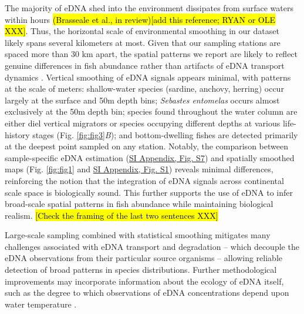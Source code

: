 \documentclass[9pt,twocolumn,twoside]{pnas-new}
\begin{document}
The majority of eDNA shed into the environment dissipates from surface waters within hours \hl{(Brasseale et al., in review)[add this reference; RYAN or OLE XXX]}. Thus, the horizontal scale of environmental smoothing in our dataset likely spans several kilometers at most. Given that our sampling stations are spaced more than 30 km apart, the spatial patterns we report are likely to reflect genuine differences in fish abundance rather than artifacts of eDNA transport dynamics \cite{guri2023}. Vertical smoothing of eDNA signals appears minimal, with patterns at the scale of meters: shallow-water species (sardine, anchovy, herring) occur largely at the surface and 50m depth bins; \textit{Sebastes entomelas} occurs almost exclusively at the 50m depth bin; species found throughout the water column are either diel vertical migrators or species occupying different depths at various life-history stages (Fig. \ref{fig:fig3}\textit{B}); and bottom-dwelling fishes are detected primarily at the deepest point sampled on any station. Notably, the comparison between sample-specific eDNA estimation (\href{SI_Appendix.pdf}{SI Appendix, Fig. S7}) and spatially smoothed maps (Fig. \ref{fig:fig1} and \href{SI_Appendix.pdf}{SI Appendix, Fig. S1}) reveals minimal differences, reinforcing the notion that the integration of eDNA signals across continental scale space is biologically sound. This further supports the use of eDNA to infer broad-scale spatial patterns in fish abundance while maintaining biological realism. \hl{[Check the framing of the last two sentences XXX]}

Large-scale sampling combined with statistical smoothing mitigates many challenges associated with eDNA transport and degradation -- which decouple the eDNA observations from their particular source organisms -- allowing reliable detection of broad patterns in species distributions. Further methodological improvements may incorporate information about the ecology of eDNA itself, such as the degree to which observations of eDNA concentrations depend upon water temperature \cite{jo2019b}. 

\end{document}
